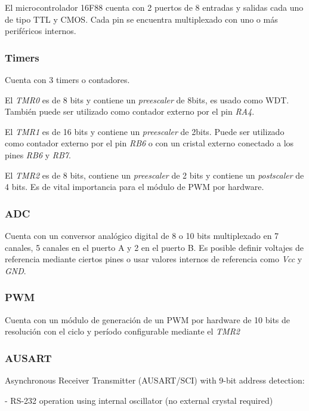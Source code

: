 \documentclass[a4paper,10pt]{article}
\begin{document}
El microcontrolador 16F88 cuenta con 2 puertos de 8 entradas y salidas cada uno de tipo TTL y CMOS.
Cada pin se encuentra multiplexado con uno o m\'as perif\'ericos internos.

\subsubsection{Timers}
\label{timers}

Cuenta con 3 timers o contadores.

El \emph{TMR0} es de 8 bits y contiene un \emph{preescaler} de 8bits, es usado como WDT.
Tambi\'en puede ser utilizado como contador externo por el pin \emph{RA4}.

El \emph{TMR1} es de 16 bits y contiene un \emph{preescaler} de 2bits.
Puede ser utilizado como contador externo por el pin \emph{RB6} o con un cristal externo conectado a los pines \emph{RB6} y \emph{RB7}.

El \emph{TMR2} es de 8 bits, contiene un \emph{preescaler} de 2 bits y contiene un \emph{postscaler} de 4 bits.
Es de vital importancia para el m\'odulo de PWM por hardware.

\subsubsection{ADC}
\label{adc}

Cuenta con un conversor anal\'ogico digital de 8 o 10 bits multiplexado en 7 canales, 5 canales en el puerto A y 2 en el puerto B.
Es posible definir voltajes de referencia mediante ciertos pines o usar valores internos de referencia como \emph{Vcc} y \emph{GND}.

\subsubsection{PWM}
\label{pwm}

Cuenta con un m\'odulo de generaci\'on de un PWM por hardware de 10 bits de resoluci\'on con el ciclo y per\'iodo configurable mediante el \emph{TMR2}

\subsubsection{AUSART}
\label{ausart}

Asynchronous Receiver Transmitter
(AUSART/SCI) with 9-bit address detection:

- RS-232 operation using internal oscillator
(no external crystal required)
\end{document}
